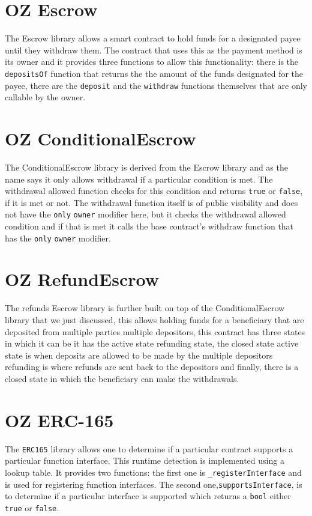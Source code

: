 \section{OZ Escrow}
The Escrow library allows a smart contract to hold funds for a designated payee until they withdraw them. The contract that uses this as the payment method is its owner and it provides three functions to allow this functionality: there is the \verb|depositsOf| function that returns the the amount of the funds designated for the payee, there are the \verb|deposit| and the \verb|withdraw| functions themselves that are only callable by the owner.

\section{OZ ConditionalEscrow}
The ConditionalEscrow library is derived from the Escrow library and as the name says it only allows withdrawal if a particular condition is met. The withdrawal allowed function checks for this condition and returns \verb|true| or \verb|false|, if it is met or not. The withdrawal function itself is of public visibility and does not have the \verb|only| \verb|owner| modifier here, but it checks the withdrawal allowed condition and if that is met it calls the base contract's withdraw function that has the \verb|only| \verb|owner| modifier.

\section{OZ RefundEscrow}
The refunds Escrow library is further built on top of the ConditionalEscrow library that we just discussed, this allows holding funds for a beneficiary that are deposited from multiple parties multiple depositors, this contract has three states in which it can be it has the active state refunding state, the closed state active state is when deposits are allowed to be made by the multiple depositors refunding is where refunds are sent back to the depositors and finally, there is a closed state in which the beneficiary can make the withdrawals.

\section{OZ ERC-165}
The \verb|ERC165| library allows one to determine if a particular contract supports a particular function interface. This runtime detection is implemented using a lookup table. It provides two functions: the first one is \verb|_registerInterface| and is used for registering function interfaces. The second one,\linebreak\verb|supportsInterface|, is to determine if a particular interface is supported which returns a \verb|bool| either \verb|true| or \verb|false|.

